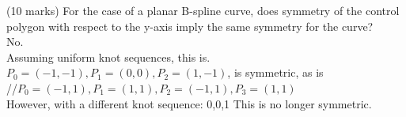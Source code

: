(10 marks) For the case of a planar B-spline curve, does symmetry of the control polygon with respect to the y-axis imply the same symmetry for the curve? \\

No. \\

Assuming uniform knot sequences, this is.
$P_0 = (-1,-1), P_1 = (0,0) , P_2 = (1,-1)$, is symmetric, as is \\
//$P_0 = (-1,1), P_1 = (1,1), P_2 = (-1,1), P_3 = (1,1)$  \\

However, with a different knot sequence: {0,0,1}
This is no longer symmetric.
